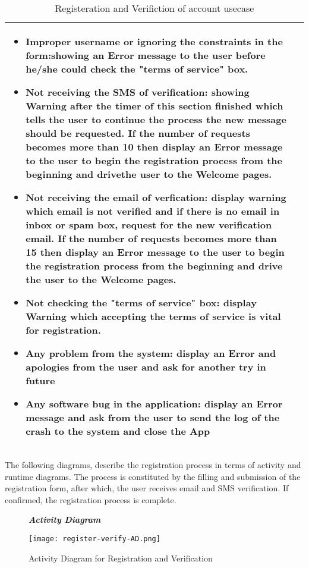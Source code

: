 \begin{table}[H]
\begin{tabulary}{\textwidth}{|J|J|}
\begin{minipage}[t]{0.6\textwidth}
\begin{itemize}
\item Improper username or ignoring the constraints in the form:showing an Error message to the user before he/she could check the "terms of service" box.
\item Not receiving the SMS of verification: showing Warning after the timer of this section finished which tells the user to continue the process the new message should be requested. If the number of requests becomes more than 10 then display an Error message to the user to begin the registration process from the beginning and drivethe user to the Welcome pages.
\item Not receiving the email of verfication: display warning which email is not verified and if there is no email in inbox or spam box, request for the new verification email. If the number of requests becomes more than 15 then display an Error message to the user to begin the registration process from the beginning and drive the user to the Welcome pages.
\item Not checking the "terms of service" box: display Warning which accepting the terms of service is vital for registration.
\item Any problem from the system: display an Error and apologies from the user and ask for another try in future
\item Any software bug in the application: display an Error message and ask from the user to send the log of the crash to the system and close the App
\end{itemize}
\end{minipage}\\
\hline
\end{tabulary}
\caption{\label{tab:Register-Verify-account}Registeration and Verifiction of account usecase}
\end{table}

The following diagrams, describe the registration process in terms of activity and runtime diagrams. The process is constituted by the filling and submission of the registration form, after which, the user receives email and SMS verification. If confirmed, the registration process is complete.

\begin{figure}[H]
\begin{flushleft}\emph{\textbf{Activity Diagram}}\end{flushleft}
\caption{Activity Diagram for Registration and Verification}
\label{register-verify-AD}
\centering
\texttt{[image: register-verify-AD.png]}
\end{figure}

